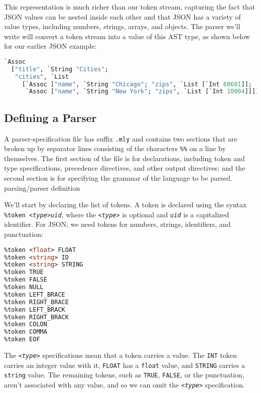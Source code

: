 This representation is much richer than our token stream, capturing the
fact that JSON values can be nested inside each other and that JSON has
a variety of value types, including numbers, strings, arrays, and
objects. The parser we'll write will convert a token stream into a value
of this AST type, as shown below for our earlier JSON example:

\begin{lstlisting}[language=Caml]
`Assoc
  ["title", `String "Cities";
   "cities", `List
     [`Assoc ["name", `String "Chicago"; "zips", `List [`Int 60601]];
      `Assoc ["name", `String "New York"; "zips", `List [`Int 10004]]]]
\end{lstlisting}

\hypertarget{defining-a-parser}{%
\subsection{Defining a Parser}\label{defining-a-parser}}

A parser-specification file has suffix \passthrough{\lstinline!.mly!}
and contains two sections that are broken up by separator lines
consisting of the characters \passthrough{\lstinline!\%\%!} on a line by
themselves. The first section of the file is for declarations, including
token and type specifications, precedence directives, and other output
directives; and the second section is for specifying the grammar of the
language to be parsed.
\protect\hypertarget{PARSparsdef}{}{parsing/parser
definition}

We'll start by declaring the list of tokens. A token is declared using
the syntax
\passthrough{\lstinline!\%token <!}\emph{\passthrough{\lstinline!type!}}\passthrough{\lstinline!>!}\emph{\passthrough{\lstinline!uid!}},
where the \emph{\passthrough{\lstinline!<type>!}} is optional and
\emph{\passthrough{\lstinline!uid!}} is a capitalized identifier. For
JSON, we need tokens for numbers, strings, identifiers, and punctuation:

\begin{lstlisting}[language=Caml]
%token <int> INT
%token <float> FLOAT
%token <string> ID
%token <string> STRING
%token TRUE
%token FALSE
%token NULL
%token LEFT_BRACE
%token RIGHT_BRACE
%token LEFT_BRACK
%token RIGHT_BRACK
%token COLON
%token COMMA
%token EOF
\end{lstlisting}

The
\passthrough{\lstinline!<!}\emph{\passthrough{\lstinline!type!}}\passthrough{\lstinline!>!}
specifications mean that a token carries a value. The
\passthrough{\lstinline!INT!} token carries an integer value with it,
\passthrough{\lstinline!FLOAT!} has a \passthrough{\lstinline!float!}
value, and \passthrough{\lstinline!STRING!} carries a
\passthrough{\lstinline!string!} value. The remaining tokens, such as
\passthrough{\lstinline!TRUE!}, \passthrough{\lstinline!FALSE!}, or the
punctuation, aren't associated with any value, and so we can omit the
\passthrough{\lstinline!<!}\emph{\passthrough{\lstinline!type!}}\passthrough{\lstinline!>!}
specification.

